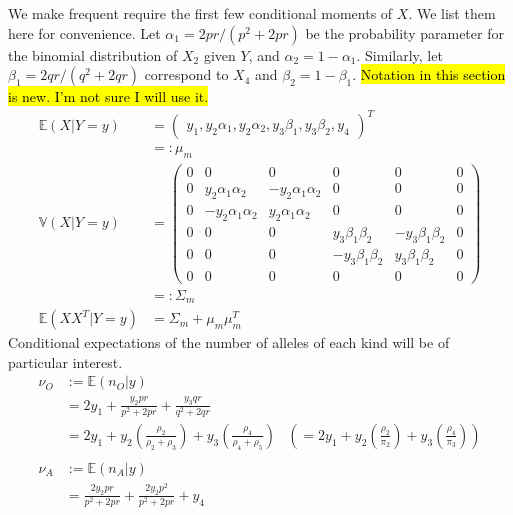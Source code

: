 \documentclass[11pt, oneside]{article}   	%
\newcommand{\bV}{\mathbb{V}}
\newcommand{\bE}{\mathbb{E}}
\begin{document}
\begin{appendices}
    We make frequent require the first few conditional moments of $X$. We list them here for convenience. Let $\alpha_1 = 2pr / (p^2 + 2pr)$ be the probability parameter for the binomial distribution of $X_2$ given $Y$, and $\alpha_2 = 1 - \alpha_1$. Similarly, let $\beta_1 = 2qr / (q^2 + 2qr)$ correspond to $X_4$ and $\beta_2 = 1 - \beta_1$. \hl{Notation in this section is new. I'm not sure I will use it.}
    \begin{align}
        \bE(X | Y=y) &= \begin{pmatrix}
            y_1,  y_2 \alpha_1,  y_2 \alpha_2,  y_3 \beta_1,  y_3 \beta_2,  y_4
        \end{pmatrix}^T\\
        &=: \mu_m\\
        \bV(X | Y=y) &= \begin{pmatrix}
            0 & 0 & 0 & 0 & 0 & 0\\
            0 & y_2 \alpha_1 \alpha_2 & - y_2 \alpha_1 \alpha_2 & 0 & 0 & 0\\
            0 & - y_2 \alpha_1 \alpha_2 & y_2 \alpha_1 \alpha_2 & 0 & 0 & 0\\
            0 & 0 & 0 & y_3 \beta_1 \beta_2 & - y_3 \beta_1 \beta_2 & 0\\
            0 & 0 & 0 & -y_3 \beta_1 \beta_2 & y_3 \beta_1 \beta_2 & 0\\
            0 & 0 & 0 & 0 & 0 & 0
        \end{pmatrix}\\
        &=: \Sigma_m\\
        \bE(XX^T | Y=y) &= \Sigma_m + \mu_m \mu_m^T
    \end{align}
    Conditional expectations of the number of alleles of each kind will be of particular interest.
    \begin{align}
        \nu_O & := \bE(n_O|y)\\
         &= 2y_1 + \frac{y_2 pr}{p^2 + 2pr} + \frac{y_3 qr}{q^2 + 2qr}\\
        &= 2y_1 + y_2 \left( \frac{\rho_2}{\rho_2 + \rho_3} \right) + y_3 \left( \frac{\rho_4}{\rho_4 + \rho_5} \right) &\left( = 2y_1 +  y_2 \left( \frac{\rho_2}{\pi_2} \right) + y_3 \left( \frac{\rho_4}{\pi_3} \right) \right)\\
        \nonumber \\
        \nu_A & := \bE(n_A|y)\\
        &= \frac{2 y_2 pr}{p^2 + 2pr} + \frac{2y_2 p^2}{p^2 + 2pr} + y_4\\

\end{align}
\end{appendices}
\end{document}
